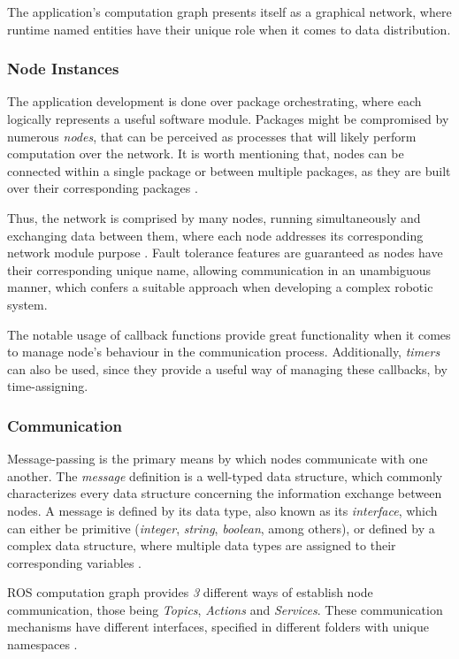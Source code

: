 The application's computation graph presents itself as a graphical network, where runtime named entities have their unique role when it comes to data distribution.

\subsubsection{Node Instances}

The application development is done over package orchestrating, where each logically represents a useful software module. Packages might be compromised by numerous \textit{nodes}, that can be perceived as processes that will likely perform computation over the network. It is worth mentioning that, nodes can be connected within a single package or between multiple packages, as they are built over their corresponding packages \cite{cousins2010welcome, intro-ros}.

Thus, the network is comprised by many nodes, running simultaneously and exchanging data between them, where each node addresses its corresponding network module purpose \cite{ros2documentation}. Fault tolerance features are guaranteed as nodes have their corresponding unique name, allowing communication in an unambiguous manner, which confers a suitable approach when developing a complex robotic system.

The notable usage of callback functions provide great functionality when it comes to manage node's behaviour in the communication process. Additionally, \textit{timers} can also be used, since they provide a useful way of managing these callbacks, by time-assigning.

\subsubsection{Communication}

Message-passing is the primary means by which nodes communicate with one another. The \textit{message} definition is a well-typed data structure, which commonly characterizes every data structure concerning the information exchange between nodes. A message is defined by its data type, also known as its \textit{interface}, which can either be primitive (\textit{integer}, \textit{string}, \textit{boolean}, among others), or defined by a complex data structure, where multiple data types are assigned to their corresponding variables \cite{ros2documentation, intro-ros}.

ROS computation graph provides \textit{3} different ways of establish node communication, those being \textit{Topics}, \textit{Actions} and \textit{Services}. These communication mechanisms have different interfaces, specified in different folders with unique namespaces \cite{ros2documentation}.

